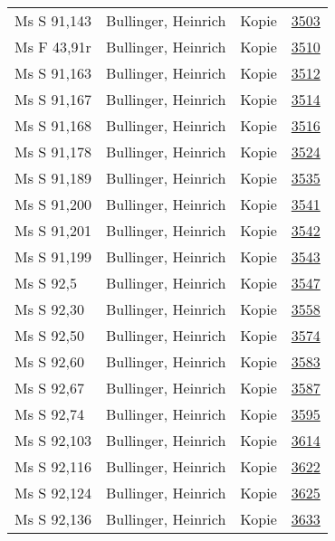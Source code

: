 \documentclass[10pt,a4paper,landscape]{report}
\begin{document}
\begin{longtable}{p{16cm}p{4cm}lr}
Ms S 91,143	&	Bullinger, Heinrich	&	Kopie	&	\href{http://130.60.24.72/assignment/3503}{3503}\\
Ms F 43,91r	&	Bullinger, Heinrich	&	Kopie	&	\href{http://130.60.24.72/assignment/3510}{3510}\\
Ms S 91,163	&	Bullinger, Heinrich	&	Kopie	&	\href{http://130.60.24.72/assignment/3512}{3512}\\
Ms S 91,167	&	Bullinger, Heinrich	&	Kopie	&	\href{http://130.60.24.72/assignment/3514}{3514}\\
Ms S 91,168	&	Bullinger, Heinrich	&	Kopie	&	\href{http://130.60.24.72/assignment/3516}{3516}\\
Ms S 91,178	&	Bullinger, Heinrich	&	Kopie	&	\href{http://130.60.24.72/assignment/3524}{3524}\\
Ms S 91,189	&	Bullinger, Heinrich	&	Kopie	&	\href{http://130.60.24.72/assignment/3535}{3535}\\
Ms S 91,200	&	Bullinger, Heinrich	&	Kopie	&	\href{http://130.60.24.72/assignment/3541}{3541}\\
Ms S 91,201	&	Bullinger, Heinrich	&	Kopie	&	\href{http://130.60.24.72/assignment/3542}{3542}\\
Ms S 91,199	&	Bullinger, Heinrich	&	Kopie	&	\href{http://130.60.24.72/assignment/3543}{3543}\\
Ms S 92,5	&	Bullinger, Heinrich	&	Kopie	&	\href{http://130.60.24.72/assignment/3547}{3547}\\
Ms S 92,30	&	Bullinger, Heinrich	&	Kopie	&	\href{http://130.60.24.72/assignment/3558}{3558}\\
Ms S 92,50	&	Bullinger, Heinrich	&	Kopie	&	\href{http://130.60.24.72/assignment/3574}{3574}\\
Ms S 92,60	&	Bullinger, Heinrich	&	Kopie	&	\href{http://130.60.24.72/assignment/3583}{3583}\\
Ms S 92,67	&	Bullinger, Heinrich	&	Kopie	&	\href{http://130.60.24.72/assignment/3587}{3587}\\
Ms S 92,74	&	Bullinger, Heinrich	&	Kopie	&	\href{http://130.60.24.72/assignment/3595}{3595}\\
Ms S 92,103	&	Bullinger, Heinrich	&	Kopie	&	\href{http://130.60.24.72/assignment/3614}{3614}\\
Ms S 92,116	&	Bullinger, Heinrich	&	Kopie	&	\href{http://130.60.24.72/assignment/3622}{3622}\\
Ms S 92,124	&	Bullinger, Heinrich	&	Kopie	&	\href{http://130.60.24.72/assignment/3625}{3625}\\
Ms S 92,136	&	Bullinger, Heinrich	&	Kopie	&	\href{http://130.60.24.72/assignment/3633}{3633}\\

\end{longtable}
\end{document}
